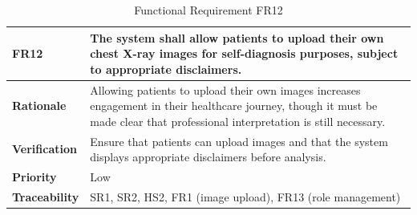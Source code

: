 \documentclass[12pt]{article}
\begin{document}
\begin{table}[h!]
\centering
{}
\begin{tabular}{|p{3.5cm}|p{11.5cm}|}
\hline
\rowcolor{gray!30}
\textbf{FR12} & The system shall allow patients to upload their own chest X-ray images for self-diagnosis purposes, subject to appropriate disclaimers. \\
\hline
\textbf{Rationale} & Allowing patients to upload their own images increases engagement in their healthcare journey, though it must be made clear that professional interpretation is still necessary. \\
\hline
\textbf{Verification} & Ensure that patients can upload images and that the system displays appropriate disclaimers before analysis. \\
\hline
\textbf{Priority} & Low \\
\hline
\textbf{Traceability} & SR1, SR2, HS2, FR1 (image upload), FR13 (role management) \\
\hline
\end{tabular}
\caption{Functional Requirement FR12}
\end{table}
\end{document}
